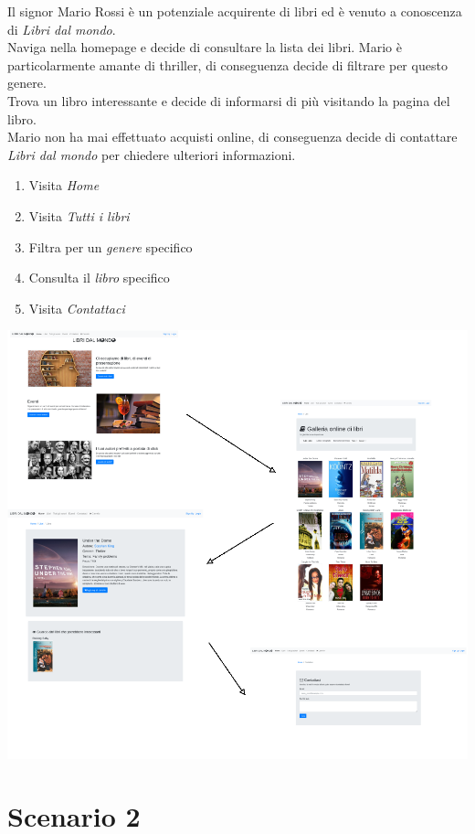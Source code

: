 \documentclass[12pt,a4paper,oneside]{report}
\begin{document}
Il signor Mario Rossi è un potenziale acquirente di libri ed è venuto a conoscenza di \textit{Libri dal mondo}. \\ 
Naviga nella homepage e decide di consultare la lista dei libri. Mario è particolarmente amante di thriller, di conseguenza decide di filtrare per questo genere. \\
Trova un libro interessante e decide di informarsi di più visitando la pagina del libro. \\
Mario non ha mai effettuato acquisti online, di conseguenza decide di contattare \textit{Libri dal mondo} per chiedere ulteriori informazioni.

\begin{enumerate}
	\item Visita \textit{Home}
	\item Visita \textit{Tutti i libri}
	\item Filtra per un \textit{genere} specifico
	\item Consulta il \textit{libro} specifico
	\item Visita \textit{Contattaci}
\end{enumerate}

\includegraphics[width=1\textwidth]{scenario_1}

\section{Scenario 2}
\end{document}
